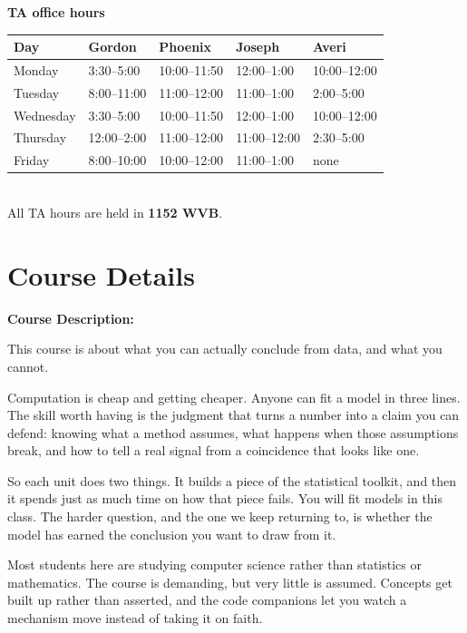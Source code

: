 \documentclass[11pt]{article}
\begin{document}
{\large \textbf{TA office hours}}\\[4pt]
\begin{tabular}{l l l l l}
\hline
\textbf{Day} & \textbf{Gordon} & \textbf{Phoenix} & \textbf{Joseph} & \textbf{Averi} \\
\hline
Monday    & 3:30--5:00  & 10:00--11:50 & 12:00--1:00  & 10:00--12:00 \\
Tuesday   & 8:00--11:00 & 11:00--12:00 & 11:00--1:00  & 2:00--5:00 \\
Wednesday & 3:30--5:00  & 10:00--11:50 & 12:00--1:00  & 10:00--12:00 \\
Thursday  & 12:00--2:00 & 11:00--12:00 & 11:00--12:00 & 2:30--5:00 \\
Friday    & 8:00--10:00 & 10:00--12:00 & 11:00--1:00  & none \\
\hline
\end{tabular}\\[3pt]
{\small All TA hours are held in \textbf{1152 WVB}.}
\vspace{5mm}

\section*{Course Details}

\textbf{\large Course Description:}

This course is about what you can actually conclude from data, and what you cannot.

Computation is cheap and getting cheaper. Anyone can fit a model in three lines. The skill worth
having is the judgment that turns a number into a claim you can defend: knowing what a method
assumes, what happens when those assumptions break, and how to tell a real signal from a
coincidence that looks like one.

So each unit does two things. It builds a piece of the statistical toolkit, and then it spends
just as much time on how that piece fails. You will fit models in this class. The harder question,
and the one we keep returning to, is whether the model has earned the conclusion you want to draw
from it.

Most students here are studying computer science rather than statistics or mathematics. The course
is demanding, but very little is assumed. Concepts get built up rather than asserted, and the code
companions let you watch a mechanism move instead of taking it on faith.
\end{document}
